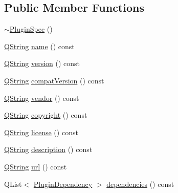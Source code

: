 \subsection*{\-Public \-Member \-Functions}
\begin{DoxyCompactItemize}
\item 
\hyperlink{class_extension_system_1_1_plugin_spec_a36fc0d85c9607b850b79415a6588c496}{$\sim$\-Plugin\-Spec} ()
\item 
\hyperlink{group___u_a_v_objects_plugin_gab9d252f49c333c94a72f97ce3105a32d}{\-Q\-String} \hyperlink{class_extension_system_1_1_plugin_spec_a822492851bc8d91f2e82960fbf6303ff}{name} () const 
\item 
\hyperlink{group___u_a_v_objects_plugin_gab9d252f49c333c94a72f97ce3105a32d}{\-Q\-String} \hyperlink{class_extension_system_1_1_plugin_spec_aa4e3f800e656d5c849a91247fa4a5b71}{version} () const 
\item 
\hyperlink{group___u_a_v_objects_plugin_gab9d252f49c333c94a72f97ce3105a32d}{\-Q\-String} \hyperlink{class_extension_system_1_1_plugin_spec_a45b8cc109ac512b48cf3781d9189959e}{compat\-Version} () const 
\item 
\hyperlink{group___u_a_v_objects_plugin_gab9d252f49c333c94a72f97ce3105a32d}{\-Q\-String} \hyperlink{class_extension_system_1_1_plugin_spec_a192dfd0c30392c994303743b8ad76d83}{vendor} () const 
\item 
\hyperlink{group___u_a_v_objects_plugin_gab9d252f49c333c94a72f97ce3105a32d}{\-Q\-String} \hyperlink{class_extension_system_1_1_plugin_spec_aedb8b15a0ecdf0d8b2ac27911594d585}{copyright} () const 
\item 
\hyperlink{group___u_a_v_objects_plugin_gab9d252f49c333c94a72f97ce3105a32d}{\-Q\-String} \hyperlink{class_extension_system_1_1_plugin_spec_aa0aea3276267028b56289d0f594089dd}{license} () const 
\item 
\hyperlink{group___u_a_v_objects_plugin_gab9d252f49c333c94a72f97ce3105a32d}{\-Q\-String} \hyperlink{class_extension_system_1_1_plugin_spec_a971d59d3293bca9fc1f312542d380a57}{description} () const 
\item 
\hyperlink{group___u_a_v_objects_plugin_gab9d252f49c333c94a72f97ce3105a32d}{\-Q\-String} \hyperlink{class_extension_system_1_1_plugin_spec_a567faa06e5f2f469ff34a53cc45cc6eb}{url} () const 
\item 
\-Q\-List$<$ \hyperlink{struct_extension_system_1_1_plugin_dependency}{\-Plugin\-Dependency} $>$ \hyperlink{class_extension_system_1_1_plugin_spec_aea2dc5245d57466a867e7f59a11a6af5}{dependencies} () const 

\end{DoxyCompactItemize}
